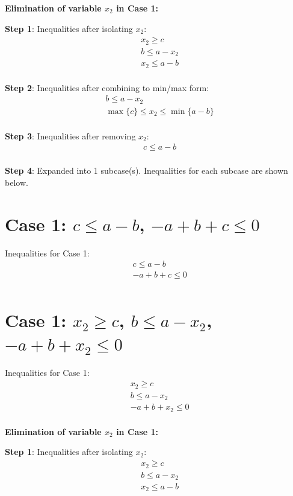 \documentclass{article}
\begin{document}
\textbf{Elimination of variable $x_{2}$ in Case 1:}

\textbf{Step 1}: Inequalities after isolating $x_{2}$:
\begin{align}
& x_{2} \geq c \\
& b \leq a - x_{2} \\
& x_{2} \leq a - b \\
\end{align}

\textbf{Step 2}: Inequalities after combining to min/max form:
\begin{align}
& b \leq a - x_{2} \\
& \max\{c\} \leq x_{2} \leq \min\{a - b\} \\
\end{align}

\textbf{Step 3}: Inequalities after removing $x_{2}$:
\begin{align}
& c \leq a - b \\
\end{align}

\textbf{Step 4}: Expanded into 1 subcase(s). Inequalities for each subcase are shown below.

\section{Case 1: $c \leq a - b$, $- a + b + c \leq 0$}

Inequalities for Case 1:
\begin{align}
& c \leq a - b \\
& - a + b + c \leq 0 \\
\end{align}

\section{Case 1: $x_{2} \geq c$, $b \leq a - x_{2}$, $- a + b + x_{2} \leq 0$}

Inequalities for Case 1:
\begin{align}
& x_{2} \geq c \\
& b \leq a - x_{2} \\
& - a + b + x_{2} \leq 0 \\
\end{align}

\textbf{Elimination of variable $x_{2}$ in Case 1:}

\textbf{Step 1}: Inequalities after isolating $x_{2}$:
\begin{align}
& x_{2} \geq c \\
& b \leq a - x_{2} \\
& x_{2} \leq a - b \\
\end{align}
\end{document}
